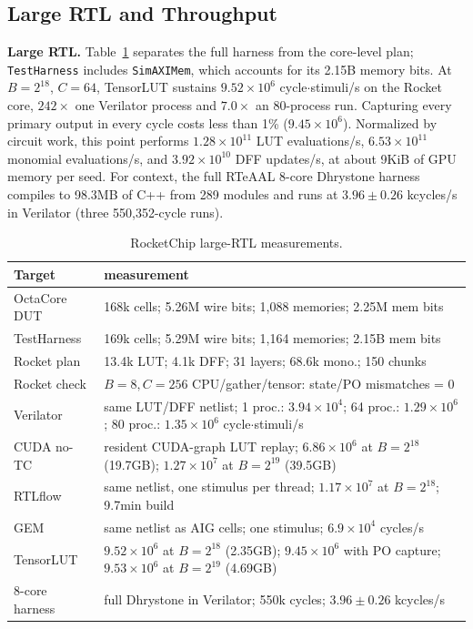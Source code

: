 \documentclass[sigconf]{acmart}
\begin{document}
\subsection{Large RTL and Throughput}
\textbf{Large RTL.} Table~\ref{tab:large} separates the full harness from the core-level plan;
\texttt{TestHarness} includes \texttt{SimAXIMem}, which accounts for its 2.15B memory bits. At
$B=2^{18}$, $C=64$, TensorLUT sustains $9.52\times10^6$ cycle$\cdot$stimuli/s on the Rocket core,
$242\times$ one Verilator process and $7.0\times$ an 80-process run. Capturing every primary output
in every cycle costs less than 1\% ($9.45\times10^6$). Normalized by circuit work, this point performs
$1.28\times10^{11}$ LUT evaluations/s, $6.53\times10^{11}$ monomial evaluations/s, and
$3.92\times10^{10}$ DFF updates/s, at about 9KiB of GPU memory per seed. For context, the full RTeAAL
8-core Dhrystone harness compiles to 98.3MB of C++ from 289 modules and runs at
$3.96\pm0.26$ kcycles/s in Verilator (three 550,352-cycle runs).

\begin{table}[tb]
\centering\footnotesize
\caption{RocketChip large-RTL measurements.}
\label{tab:large}
\setlength{\tabcolsep}{2.4pt}
\renewcommand{\arraystretch}{1.03}
\begin{tabular}{@{}p{}p{}@{}}
\toprule
Target & measurement\\
\midrule
OctaCore DUT & 168k cells; 5.26M wire bits; 1,088 memories; 2.25M mem bits\\
TestHarness & 169k cells; 5.29M wire bits; 1,164 memories; 2.15B mem bits\\
Rocket plan & 13.4k LUT; 4.1k DFF; 31 layers; 68.6k mono.; 150 chunks\\
Rocket check & $B=8,C=256$ CPU/gather/tensor: state/PO mismatches = 0\\
Verilator & same LUT/DFF netlist; 1 proc.: $3.94\times10^4$; 64 proc.: $1.29\times10^6$; 80 proc.: $1.35\times10^6$ cycle$\cdot$stimuli/s\\
CUDA no-TC & resident CUDA-graph LUT replay; $6.86\times10^6$ at $B=2^{18}$ (19.7GB); $1.27\times10^7$ at $B=2^{19}$ (39.5GB)\\
RTLflow & same netlist, one stimulus per thread; $1.17\times10^7$ at $B=2^{18}$; 9.7min build\\
GEM & same netlist as AIG cells; one stimulus; $6.9\times10^4$ cycles/s\\
TensorLUT & $9.52\times10^6$ at $B=2^{18}$ (2.35GB); $9.45\times10^6$ with PO capture; $9.53\times10^6$ at $B=2^{19}$ (4.69GB)\\
8-core harness & full Dhrystone in Verilator; 550k cycles; $3.96\pm0.26$ kcycles/s\\
\bottomrule
\end{tabular}
\end{table}
\end{document}
